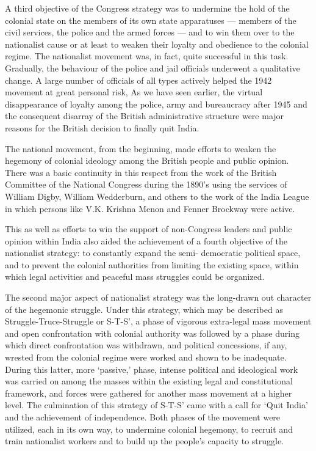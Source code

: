 \begin{multicols}{2}
A third objective of the Congress strategy was to undermine the hold of the colonial state on the members of its own state apparatuses --- members of the civil services, the police and the armed forces --- and to win them over to the nationalist cause or at least to weaken their loyalty and obedience to the colonial regime. The nationalist movement was, in fact, quite successful in this task. Gradually, the behaviour of the police and jail officials underwent a qualitative change. A large number of officials of all types actively helped the 1942 movement at great personal risk, As we have seen earlier, the virtual disappearance of loyalty among the police, army and bureaucracy after 1945 and the consequent disarray of the British administrative structure were major reasons for the British decision to finally quit India.

The national movement, from the beginning, made efforts to weaken the hegemony of colonial ideology among the British people and public opinion. There was a basic continuity in this respect from the work of the British Committee of the National Congress during the 1890's using the services of William Digby, William Wedderburn, and others to the work of the India League in which persons like V.K. Krishna Menon and Fenner Brockway were active.

This as well as efforts to win the support of non-Congress leaders and public opinion within India also aided the achievement of a fourth objective of the nationalist strategy: to constantly expand the semi- democratic political space, and to prevent the colonial authorities from limiting the existing space, within which legal activities and peaceful mass struggles could be organized.

The second major aspect of nationalist strategy was the long-drawn out character of the hegemonic struggle. Under this strategy, which may be described as Struggle-Truce-Struggle or S-T-S', a phase of vigorous extra-legal mass movement and open confrontation with colonial authority was followed by a phase during which direct confrontation was withdrawn, and political concessions, if any, wrested from the colonial regime were worked and shown to be inadequate. During this latter, more `passive,' phase, intense political and ideological work was carried on among the masses within the existing legal and constitutional framework, and forces were gathered for another mass movement at a higher level. The culmination of this strategy of S-T-S' came with a call for `Quit India' and the achievement of independence. Both phases of the movement were utilized, each in its own way, to undermine colonial hegemony, to recruit and train nationalist workers and to build up the people's capacity to struggle.


\end{multicols}
